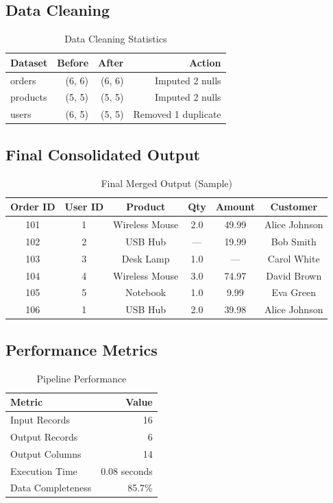\documentclass[12pt,a4paper]{report}
\begin{document}
\subsection{Data Cleaning}

\begin{table}[h]
\centering
\begin{tabular}{|l|r|r|r|}
\hline
\textbf{Dataset} & \textbf{Before} & \textbf{After} & \textbf{Action} \\
\hline
orders & (6, 6) & (6, 6) & Imputed 2 nulls \\
products & (5, 5) & (5, 5) & Imputed 2 nulls \\
users & (6, 5) & (5, 5) & Removed 1 duplicate \\
\hline
\end{tabular}
\caption{Data Cleaning Statistics}
\end{table}

\subsection{Final Consolidated Output}

\begin{table}[h]
\centering
\begin{tabular}{|c|c|c|c|c|c|}
\hline
\textbf{Order ID} & \textbf{User ID} & \textbf{Product} & \textbf{Qty} & \textbf{Amount} & \textbf{Customer} \\
\hline
101 & 1 & Wireless Mouse & 2.0 & 49.99 & Alice Johnson \\
102 & 2 & USB Hub & — & 19.99 & Bob Smith \\
103 & 3 & Desk Lamp & 1.0 & — & Carol White \\
104 & 4 & Wireless Mouse & 3.0 & 74.97 & David Brown \\
105 & 5 & Notebook & 1.0 & 9.99 & Eva Green \\
106 & 1 & USB Hub & 2.0 & 39.98 & Alice Johnson \\
\hline
\end{tabular}
\caption{Final Merged Output (Sample)}
\end{table}

\subsection{Performance Metrics}

\begin{table}[h]
\centering
\begin{tabular}{|l|r|}
\hline
\textbf{Metric} & \textbf{Value} \\
\hline
Input Records & 16 \\
Output Records & 6 \\
Output Columns & 14 \\
Execution Time & 0.08 seconds \\
Data Completeness & 85.7\% \\
\hline
\end{tabular}
\caption{Pipeline Performance}
\end{table}
\end{document}
